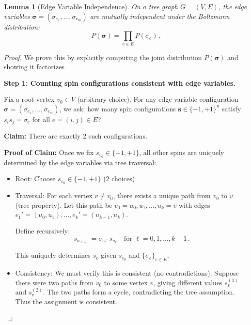 \documentclass[11pt]{article}
\newtheorem{lemma}[theorem]{Lemma}
\theoremstyle{definition}
\theoremstyle{remark}
\begin{document}
\begin{lemma}[Edge Variable Independence]
\label{lem:edge-independence}
On a tree graph $G = (V, E)$, the edge variables
$\boldsymbol{\sigma} = (\sigma_{e_1}, \ldots, \sigma_{e_m})$ are mutually
independent under the Boltzmann distribution:
\begin{equation}
\label{eq:edge-factorization}
P(\boldsymbol{\sigma}) = \prod_{e \in E} P(\sigma_e)\,.
\end{equation}
\end{lemma}

\begin{proof}
We prove this by explicitly computing the joint distribution
$P(\boldsymbol{\sigma})$ and showing it factorizes.

\textbf{Step 1: Counting spin configurations consistent with edge variables.}

Fix a root vertex $v_0 \in V$ (arbitrary choice). For any edge variable
configuration $\boldsymbol{\sigma} = (\sigma_{e_1}, \ldots, \sigma_{e_m})$,
we ask: how many spin configurations $\mathbf{s} \in \{-1, +1\}^n$ satisfy
$s_i s_j = \sigma_e$ for all $e = (i,j) \in E$?

\textbf{Claim:} There are exactly 2 such configurations.

\textbf{Proof of Claim:} Once we fix $s_{v_0} \in \{-1, +1\}$, all other spins
are uniquely determined by the edge variables via tree traversal:

\begin{itemize}
\item Root: Choose $s_{v_0} \in \{-1, +1\}$ (2 choices)

\item Traversal: For each vertex $v \neq v_0$, there exists a unique path
from $v_0$ to $v$ (tree property). Let this path be
$v_0 = u_0, u_1, \ldots, u_k = v$ with edges
$e_1' = (u_0, u_1), \ldots, e_k' = (u_{k-1}, u_k)$.

Define recursively:
\begin{equation}
s_{u_{\ell+1}} = \sigma_{e_{\ell}'}\, s_{u_{\ell}}
\quad \text{for } \ell = 0, 1, \ldots, k-1\,.
\end{equation}

This uniquely determines $s_v$ given $s_{v_0}$ and
$\{\sigma_e\}_{e \in E}$.

\item Consistency: We must verify this is consistent (no contradictions).
Suppose there were two paths from $v_0$ to some vertex $v$, giving
different values $s_v^{(1)}$ and $s_v^{(2)}$. The two paths form a cycle,
contradicting the tree assumption. Thus the assignment is consistent.
\end{itemize}


\end{proof}
\end{document}
